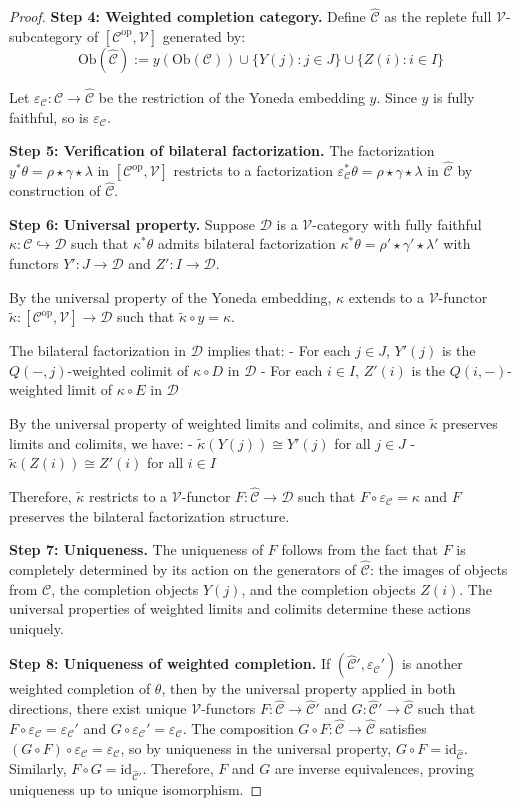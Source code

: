 \documentclass[11pt]{article}
\theoremstyle{plain}
\theoremstyle{definition}
\theoremstyle{remark}
\newcommand{\V}{\mathcal{V}}
\newcommand{\C}{\mathcal{C}}
\newcommand{\op}{\mathrm{op}}
\newcommand{\id}{\mathrm{id}}
\newcommand{\wh}[1]{\widehat{#1}}
\newcommand{\wt}[1]{\widetilde{#1}}
\begin{document}
\begin{proof}
\textbf{Step 4: Weighted completion category.} 
Define $\wh{\C}$ as the replete full $\V$-subcategory of $[\C^{\op}, \V]$ generated by:
$$\mathrm{Ob}(\wh{\C}) := y(\mathrm{Ob}(\C)) \cup \{Y(j) : j \in J\} \cup \{Z(i) : i \in I\}$$

Let $\varepsilon_\C : \C \to \wh{\C}$ be the restriction of the Yoneda embedding $y$. Since $y$ is fully faithful, so is $\varepsilon_\C$.

\textbf{Step 5: Verification of bilateral factorization.}
The factorization $y^* \theta = \rho \star \gamma \star \lambda$ in $[\C^{\op}, \V]$ restricts to a factorization $\varepsilon_\C^* \theta = \rho \star \gamma \star \lambda$ in $\wh{\C}$ by construction of $\wh{\C}$.

\textbf{Step 6: Universal property.}
Suppose $\mathcal{D}$ is a $\V$-category with fully faithful $\kappa : \mathcal{C} \hookrightarrow \mathcal{D}$ such that $\kappa^* \theta$ admits bilateral factorization $\kappa^* \theta = \rho' \star \gamma' \star \lambda'$ with functors $Y' : J \to \mathcal{D}$ and $Z' : I \to \mathcal{D}$.

By the universal property of the Yoneda embedding, $\kappa$ extends to a $\V$-functor $\wt{\kappa} : [\C^{\op}, \V] \to \mathcal{D}$ such that $\wt{\kappa} \circ y = \kappa$.

The bilateral factorization in $\mathcal{D}$ implies that:
- For each $j \in J$, $Y'(j)$ is the $Q(-, j)$-weighted colimit of $\kappa \circ D$ in $\mathcal{D}$
- For each $i \in I$, $Z'(i)$ is the $Q(i, -)$-weighted limit of $\kappa \circ E$ in $\mathcal{D}$

By the universal property of weighted limits and colimits, and since $\wt{\kappa}$ preserves limits and colimits, we have:
- $\wt{\kappa}(Y(j)) \cong Y'(j)$ for all $j \in J$
- $\wt{\kappa}(Z(i)) \cong Z'(i)$ for all $i \in I$

Therefore, $\wt{\kappa}$ restricts to a $\V$-functor $F : \wh{\C} \to \mathcal{D}$ such that $F \circ \varepsilon_\C = \kappa$ and $F$ preserves the bilateral factorization structure.

\textbf{Step 7: Uniqueness.}
The uniqueness of $F$ follows from the fact that $F$ is completely determined by its action on the generators of $\wh{\C}$: the images of objects from $\C$, the completion objects $Y(j)$, and the completion objects $Z(i)$. The universal properties of weighted limits and colimits determine these actions uniquely.

\textbf{Step 8: Uniqueness of weighted completion.}
If $(\wh{\C}', \varepsilon_\C')$ is another weighted completion of $\theta$, then by the universal property applied in both directions, there exist unique $\V$-functors $F : \wh{\C} \to \wh{\C}'$ and $G : \wh{\C}' \to \wh{\C}$ such that $F \circ \varepsilon_\C = \varepsilon_\C'$ and $G \circ \varepsilon_\C' = \varepsilon_\C$. The composition $G \circ F : \wh{\C} \to \wh{\C}$ satisfies $(G \circ F) \circ \varepsilon_\C = \varepsilon_\C$, so by uniqueness in the universal property, $G \circ F = \id_{\wh{\C}}$. Similarly, $F \circ G = \id_{\wh{\C}'}$. Therefore, $F$ and $G$ are inverse equivalences, proving uniqueness up to unique isomorphism.
\end{proof}
\end{document}
